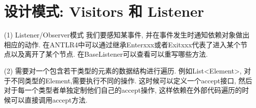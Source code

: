 \documentclass{ctexart}
\begin{document}
\section{设计模式: Visitors 和 Listener}

(1) Listener/Observer模式 我们要感知某事件, 并在事件发生时通知依赖对象做出相应的动作. 
在ANTLR4中可以通过继承Enterxxx或者Exitxxx代表了进入某个节点以及离开了某个节点. 在BaseListener可以查看可以重写哪些方法.  


(2) 需要对一个包含若干类型的元素的数据结构进行遍历. 例如List<Element>, 对于不同类型的Element,需要执行不同的操作. 这时候可以定义一个accept接口, 然后对于每一个类型者单独定制他们自己的accept操作, 这样依赖在外部代码遍历的时候可以直接调用accept方法. 
\end{document}
